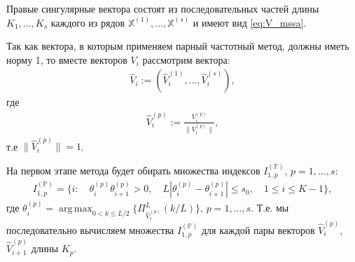 \documentclass[specialist,
               substylefile = spbu.rtx,
               subf,href,colorlinks=true, 12pt]{disser}
\def\argmax{\mathop{\mathrm{argmax}}}
\def\argmax{\mathop{\mathrm{arg\,max}}}
\begin{document}
Правые сингулярные вектора
состоят из последовательных частей длины $K_1,\ldots,K_s$ каждого из рядов $\mathbb{X}^{(1)}, \ldots, \mathbb{X}^{(s)}$ и имеют вид \eqref{eq:V_mssa}.

Так как вектора, в которым применяем парный частотный метод, должны иметь норму 1, то вместе векторов $V_i$ рассмотрим вектора: 
\begin{gather*}
\widehat{V}_{i} := \left(\widehat{V}_i^{(1)}, \ldots, \widehat{V}_i^{(s)}\right),
\end{gather*}
где
\begin{gather*} \label{eq:V_norm_mssa}
\widehat{V}_i^{(p)} := \frac{V_i^{(p)}}{\|V_i^{(p)} \|},
\end{gather*}
т.е $\| \widehat{V}_i^{(p)} \| = 1$. 

%

На первом этапе метода будет обирать множества индексов $I_{1,p}^{(\mathbb{P})}$, $p=1,\ldots,s$:
\begin{gather} \label{eq:I_1_P_mssa}
I_{1,p}^{(\mathbb{P})} = \{ i: \quad \theta_{i}^{(p)} \theta_{i+1} ^{(p)} >0, \quad L |\theta_i^{(p)} - \theta_{i+1}^{(p)}| \leqslant s_0, \quad 1 \leqslant i \leqslant K -1  \},
\end{gather}
где $\theta_i^{(p)} = \argmax_{0 < k \leqslant L/2} \{\Pi_{\widehat{V}_i^{(p)}}^L(k/L)\}$, $p=1,\ldots,s$.
Т.е. 
мы последовательно вычисляем множества $I_{1,p}^{(\mathbb{P})}$ для каждой пары векторов  $\widehat{V}_i^{(p)}$, $\widehat{V}_{i+1}^{(p)}$ длины $K_p$.
\end{document}
